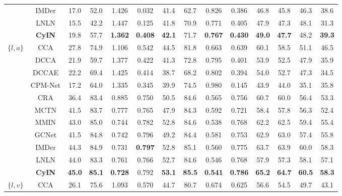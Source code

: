 \documentclass{article}
\begin{document}
\begin{table}[htbp]
{\begin{tabular}{cccccccccccccc}
        ~ & IMDer & 17.0  & 52.0  & 1.426  & 0.032  & 41.4  & 62.7  & 0.826  & 0.386  & 46.8  & 45.8  & 46.3  & 38.6 \\ 
        ~ & LNLN & 15.5  & 42.2  & 1.447  & 0.125  & 41.8  & 70.9  & 0.771  & 0.405  & 47.9  & 47.3  & 48.1  & 31.3  \\ 
    & \textbf{CyIN}  & 19.8 & 57.7 & \textbf{1.362} & \textbf{0.408} & \textbf{42.1} & 71.7 & \textbf{0.767} & \textbf{0.430} & \textbf{49.0} & \textbf{47.7} & 48.2 & \textbf{39.3} \\ 
    \midrule[0.5pt]
    \multirow{11}{*}{$\{l,a\}$} ~ & CCA & 27.8  & 74.9  & 1.106  & 0.542  & 44.5  & 81.8  & 0.663  & 0.639  & 60.1  & 58.5  & 51.1  & 46.5  \\ 
        ~ & DCCA & 21.9  & 59.7  & 1.377  & 0.422  & 41.3  & 72.8  & 0.795  & 0.401  & 53.9  & 52.5  & 47.9  & 35.9  \\ 
        ~ & DCCAE & 22.2  & 69.4  & 1.425  & 0.414  & 38.7  & 68.2  & 0.802  & 0.394  & 54.0  & 52.7  & 47.3  & 34.5  \\ 
        ~ & CPM-Net & 17.2  & 64.0  & 1.335  & 0.345  & 39.9  & 74.5  & 0.980  & 0.145  & 43.9  & 44.0  & 35.1  & 35.8  \\ 
        ~ & CRA & 36.4  & 83.4  & 0.885  & 0.750  & 50.5  & 84.6  & 0.565  & 0.756  & 60.7  & 60.0  & 56.4  & 53.3  \\ 
        ~ & MCTN & 41.5  & 83.7  & 0.777  & 0.765  & 47.9  & 84.3  & 0.592  & 0.721  & 58.4  & 57.8  & 56.3  & 52.4  \\ 
        ~ & MMIN & 43.0  & 85.0  & 0.744  & 0.782  & 52.8  & 84.6  & 0.538  & 0.768  & 62.2  & 62.5  & 59.4  & 55.4 \\ 
        ~ & GCNet & 41.5  & 84.8  & 0.742  & 0.796  & 49.2  & 84.4  & 0.581  & 0.753  & 62.9  & 63.0  & 57.4  & 55.8  \\ 
        ~ & IMDer & 44.3  & 84.9  & 0.731  & \textbf{0.797}  & 52.8  & 85.1  & 0.560  & 0.775  & 63.7  & 63.9  & 60.0  & 58.3 \\ 
         ~ & LNLN & 44.0  & 83.3  & 0.761  & 0.766  & 52.7  & 84.6  & 0.546  & 0.768  & 57.9  & 57.3  & 58.1  & 57.1  \\ 
    & \textbf{CyIN}  & \textbf{45.0} & \textbf{85.1} & \textbf{0.728} & 0.792 & \textbf{53.1} & \textbf{85.5} & \textbf{0.541} & \textbf{0.786} & \textbf{65.2} & \textbf{64.7} & \textbf{60.5} & \textbf{58.3} \\ 
    \midrule[0.5pt]
    \multirow{11}{*}{$\{l,v\}$} ~ & CCA & 26.1  & 75.6  & 1.093  & 0.570  & 44.7  & 80.7  & 0.674  & 0.625  & 56.6  & 54.5  & 49.7  & 43.1  \\ 

\end{tabular}}
\end{table}
\end{document}
